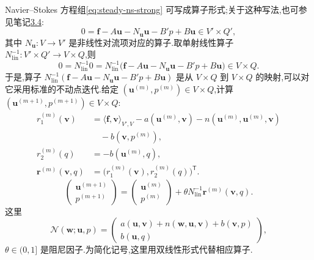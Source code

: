 \begin{note}[一般的不动点迭代]\label{note:steady-ns-general-fixed-point}
Navier--Stokes 方程组\cref{eq:steady-ns-strong} 可写成算子形式;关于这种写法,也可参见笔记\hyperref[note:operator-form-saddle-point]{3.4}:
\[
  0=\bm{f}-A\bm{u}-N_{\bm{u}}\bm{u}-B'p+B\bm{u}
       \in V'\times Q',
\]
其中 $N_{\bm{u}}:V\to V'$ 是非线性对流项对应的算子.取单射线性算子
$N_{\mathrm{lin}}^{-1}:V'\times Q'\to V\times Q$,则
\[
  0=N_{\mathrm{lin}}^{-1}0
    =N_{\mathrm{lin}}^{-1}
      \bigl(\bm{f}-A\bm{u}-N_{\bm{u}}\bm{u}
                    -B'p+B\bm{u}\bigr)\in V\times Q.
\]
于是,算子
$N_{\mathrm{lin}}^{-1}(\bm{f}-A\bm{u}-N_{\bm{u}}\bm{u}-B'p+B\bm{u})$
是从 $V\times Q$ 到 $V\times Q$ 的映射,可以对它采用标准的不动点迭代.给定
$(\bm{u}^{(m)},p^{(m)})\in V\times Q$,计算
$(\bm{u}^{(m+1)},p^{(m+1)})\in V\times Q$:
\[
  \begin{aligned}
    r_1^{(m)}(\bm{v})
      &=\langle\bm{f},\bm{v}\rangle_{V',V}
         -a(\bm{u}^{(m)},\bm{v})
         -n(\bm{u}^{(m)},\bm{u}^{(m)},\bm{v})\\
      &\quad-b(\bm{v},p^{(m)}),\\
    r_2^{(m)}(q)&=-b(\bm{u}^{(m)},q),\\
    \bm{r}^{(m)}(\bm{v},q)
      &=\bigl(r_1^{(m)}(\bm{v}),r_2^{(m)}(q)\bigr)^{\mathsf T}.
  \end{aligned}
\]
\begin{equation}\label{eq:steady-ns-fixed-point-iteration}
\begin{pmatrix}
  \bm{u}^{(m+1)}\\ p^{(m+1)}
\end{pmatrix}
=
\begin{pmatrix}
  \bm{u}^{(m)}\\ p^{(m)}
\end{pmatrix}
+\theta N_{\mathrm{lin}}^{-1}\bm{r}^{(m)}(\bm{v},q).
\end{equation}
这里
\[
  \mathcal{N}(\bm{w};\bm{u},p)
  =
  \begin{pmatrix}
    a(\bm{u},\bm{v})+n(\bm{w},\bm{u},\bm{v})
                         +b(\bm{v},p)\\
    b(\bm{u},q)
  \end{pmatrix},
\]
$\theta\in(0,1]$ 是阻尼因子.为简化记号,这里用双线性形式代替相应算子.


\end{note}
